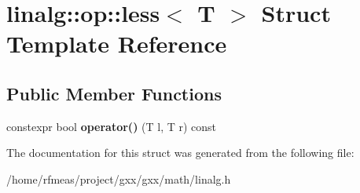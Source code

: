 \hypertarget{structlinalg_1_1op_1_1less}{}\section{linalg\+:\+:op\+:\+:less$<$ T $>$ Struct Template Reference}
\label{structlinalg_1_1op_1_1less}
\subsection*{Public Member Functions}
\begin{DoxyCompactItemize}
\item 
constexpr bool {\bfseries operator()} (T l, T r) const \hypertarget{structlinalg_1_1op_1_1less_aeb01e3003155f4b656cf242362d5c7ce}{}\label{structlinalg_1_1op_1_1less_aeb01e3003155f4b656cf242362d5c7ce}

\end{DoxyCompactItemize}


The documentation for this struct was generated from the following file\+:\begin{DoxyCompactItemize}
\item 
/home/rfmeas/project/gxx/gxx/math/linalg.\+h\end{DoxyCompactItemize}
